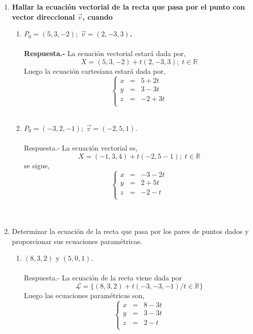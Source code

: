 \begin{enumerate}

    \item \textbf{\boldmath Hallar la ecuación vectorial de la recta que pasa por el punto con vector direccional $\vec{v}$, cuando}
	\begin{enumerate}[\bfseries a)]
	    
	    \item \textbf{\boldmath $P_0=(5,3,-2); \; \vec{v}=(2,-3,3)$.\\\\
		Respuesta.-}\; La ecuación vectorial estará dada por, $$ X = (5,3,-2) + t(2,-3,3) ;\;  t \in \mathbb{R}$$ 
		Luego la ecuación cartesiana estará dada por, 
		$$\left\{\begin{array}{rcr}
		    x&=&5+2t\\
		    y&=&3-3t\\
		    z&=&-2+3t\\
		\end{array}\right.$$\\

	    \item $P_0=(-3,2,-1); \; \vec{v}=(-2,5,1)$.\\\\
		Respuesta.-\; La ecuación vectorial es, $$X= (-1,3,4) + t(-2,5-1) ;\;  t\in \mathbb{R} $$
		se sigue,
		$$\left\{\begin{array}{rcr}
		    x&=&-3-2t\\
		    y&=&2+5t\\
		    z&=&-2-t\\
		\end{array}\right.$$\\\\

	\end{enumerate}

    \item Determinar la ecuación de la recta que pasa por los pares de puntos dados y proporcionar sus ecuaciones paramétricas.

	\begin{enumerate}[\bfseries a)]
	    
	    \item $(8,3,2)$ y $(5,0,1)$.\\\\
		Respuesta.-\; La ecuación de la recta viene dada por 
		$$\mathcal{L} = \lbrace (8,3,2) + t(-3,-3,-1) / t\in \mathbb{R} \rbrace$$
		Luego las ecuaciones paramétricas son, 
		$$\left\{\begin{array}{rcr}
		    x&=&8-3t\\
		    y&=&3-3t\\
		    z&=&2-t\\
		\end{array}\right.$$\\


\end{enumerate}
\end{enumerate}
